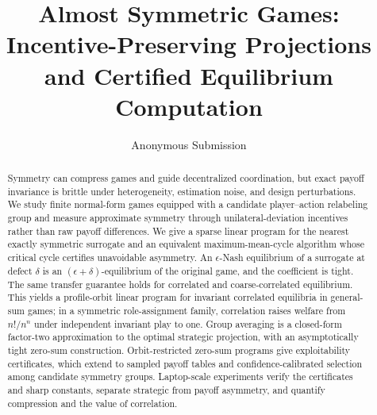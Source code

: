 \documentclass[letterpaper]{article}
\title{Almost Symmetric Games: Incentive-Preserving Projections and Certified Equilibrium Computation}
\author{Anonymous Submission}
\begin{document}
\maketitle

\begin{abstract}
Symmetry can compress games and guide decentralized coordination, but exact payoff invariance is brittle under heterogeneity, estimation noise, and design perturbations.  We study finite normal-form games equipped with a candidate player--action relabeling group and measure approximate symmetry through unilateral-deviation incentives rather than raw payoff differences.  We give a sparse linear program for the nearest exactly symmetric surrogate and an equivalent maximum-mean-cycle algorithm whose critical cycle certifies unavoidable asymmetry.  An $\epsilon$-Nash equilibrium of a surrogate at defect $\delta$ is an $(\epsilon+\delta)$-equilibrium of the original game, and the coefficient is tight.  The same transfer guarantee holds for correlated and coarse-correlated equilibrium.  This yields a profile-orbit linear program for invariant correlated equilibria in general-sum games; in a symmetric role-assignment family, correlation raises welfare from $n!/n^n$ under independent invariant play to one.  Group averaging is a closed-form factor-two approximation to the optimal strategic projection, with an asymptotically tight zero-sum construction.  Orbit-restricted zero-sum programs give exploitability certificates, which extend to sampled payoff tables and confidence-calibrated selection among candidate symmetry groups.  Laptop-scale experiments verify the certificates and sharp constants, separate strategic from payoff asymmetry, and quantify compression and the value of correlation.
\end{abstract}














\label{lasttechnical}

\end{document}
